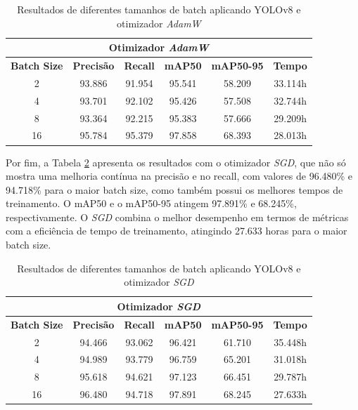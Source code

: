 \begin{table}[!hbt]
    \centering
    \begin{tabular}{|c|c|c|c|c|c|}
    \hline
    \multicolumn{6}{|c|}{\textbf{Otimizador \textit{AdamW}}} \\ \hline
    \textbf{Batch Size} & \textbf{Precisão} & \textbf{Recall} & \textbf{mAP50} & \textbf{mAP50-95} & \textbf{Tempo} \\ \hline
    2                   & 93.886            & 91.954          & 95.541         & 58.209            & 33.114h        \\ \hline
    4                   & 93.701            & 92.102          & 95.426         & 57.508            & 32.744h        \\ \hline
    8                   & 93.364            & 92.215          & 95.383         & 57.666            & 29.209h        \\ \hline
    16                  & 95.784            & 95.379          & 97.858         & 68.393            & 28.013h        \\ \hline
    \end{tabular}
    \caption{Resultados de diferentes tamanhos de batch aplicando YOLOv8 e otimizador \textit{AdamW}}
    \label{tab:yolov8-admw}
\end{table}

Por fim, a Tabela \ref{tab:yolov8-sgd} apresenta os resultados com o otimizador \textit{SGD}, que não só mostra uma melhoria contínua na precisão e no recall, com valores de 96.480\% e 94.718\% para o maior batch size, como também possui os melhores tempos de treinamento. O mAP50 e o mAP50-95 atingem 97.891\% e 68.245\%, respectivamente. O \textit{SGD} combina o melhor desempenho em termos de métricas com a eficiência de tempo de treinamento, atingindo 27.633 horas para o maior batch size.

\begin{table}[!hbt]
    \centering
    \begin{tabular}{|c|c|c|c|c|c|}
    \hline
    \multicolumn{6}{|c|}{\textbf{Otimizador \textit{SGD}}} \\ \hline
    \textbf{Batch Size} & \textbf{Precisão} & \textbf{Recall} & \textbf{mAP50} & \textbf{mAP50-95} & \textbf{Tempo} \\ \hline
    2                   & 94.466            & 93.062          & 96.421         & 61.710            & 35.448h        \\ \hline
    4                   & 94.989            & 93.779          & 96.759         & 65.201            & 31.018h        \\ \hline
    8                   & 95.618            & 94.621          & 97.123         & 66.451            & 29.787h        \\ \hline
    16                  & 96.480            & 94.718          & 97.891         & 68.245            & 27.633h        \\ \hline
    \end{tabular}
    \caption{Resultados de diferentes tamanhos de batch aplicando YOLOv8 e otimizador \textit{SGD}}
    \label{tab:yolov8-sgd}
\end{table}


